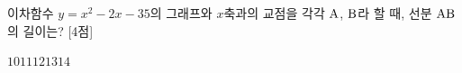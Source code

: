 이차함수 $y=x^2-2x-35$의 그래프와 $x$축과의 교점을 각각 $\mathrm{A}$, $\mathrm{B}$라 할 때, 선분 $\mathrm{AB}$의 길이는? \mbox{[4점]}
\begin{choices32}{$10$}{$11$}{$12$}{$13$}{$14$}\end{choices32}
